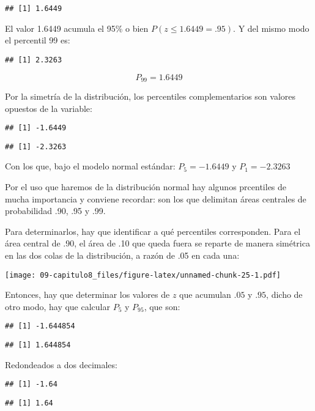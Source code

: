\documentclass[]{article}
\begin{document}
\begin{verbatim}
## [1] 1.6449
\end{verbatim}

El valor 1.6449 acumula el 95\% o bien \(P(z\leq1.6449=.95)\). Y del
mismo modo el percentil 99 es:

\begin{verbatim}
## [1] 2.3263
\end{verbatim}

\[P_{99}=1.6449\]

Por la simetría de la distribución, los percentiles complementarios son
valores opuestos de la variable:

\begin{verbatim}
## [1] -1.6449
\end{verbatim}

\begin{verbatim}
## [1] -2.3263
\end{verbatim}

Con los que, bajo el modelo normal estándar: \(P_{5}=-1.6449\) y
\(P_{1}=-2.3263\)

Por el uso que haremos de la distribución normal hay algunos prcentiles
de mucha importancia y conviene recordar: son los que delimitan áreas
centrales de probabilidad .90, .95 y .99.

Para determinarlos, hay que identificar a qué percentiles corresponden.
Para el área central de .90, el área de .10 que queda fuera se reparte
de manera simétrica en las dos colas de la distribución, a razón de .05
en cada una:

\texttt{[image: 09-capitulo8\_files/figure-latex/unnamed-chunk-25-1.pdf]}

Entonces, hay que determinar los valores de \(z\) que acumulan \(.05\) y
\(.95\), dicho de otro modo, hay que calcular \(P_{5}\) y \(P_{95}\),
que son:

\begin{verbatim}
## [1] -1.644854
\end{verbatim}

\begin{verbatim}
## [1] 1.644854
\end{verbatim}

Redondeados a dos decimales:

\begin{verbatim}
## [1] -1.64
\end{verbatim}

\begin{verbatim}
## [1] 1.64
\end{verbatim}
\end{document}
